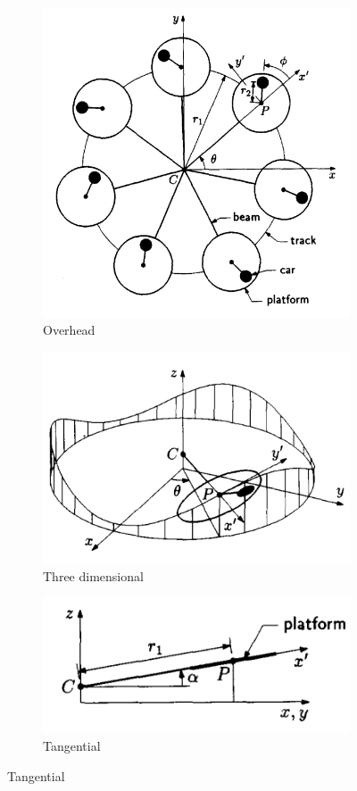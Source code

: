 \documentclass{article}
\begin{document}
\begin{figure}

\begin{subfigure}{0.49\textwidth}
\includegraphics[width=0.9\linewidth]{Pics/tawplan.png} 
\caption{Overhead}
\end{subfigure}

\begin{subfigure}{0.49\textwidth}
\includegraphics[width=0.9\linewidth]{Pics/tawperspective.png}
\caption{Three dimensional}
\end{subfigure}

\begin{subfigure}{0.49\textwidth}
\includegraphics[width=0.9\linewidth]{Pics/tawtangential.png}
\caption{Tangential}
\end{subfigure}


\end{figure}
\end{document}
